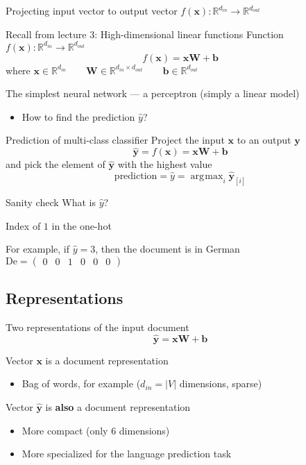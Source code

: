\documentclass[12pt,aspectratio=169,handout]{beamer}
\DeclareMathOperator*{\argmax}{arg\!\max}
\begin{document}
\begin{frame}{Projecting input vector to output vector $f(\bm{x}) : \mathbb{R}^{d_{in}} \to \mathbb{R}^{d_{out}}$}
	
\pause
\begin{block}{Recall from lecture 3: High-dimensional linear functions}
Function $f(\bm{x}) : \mathbb{R}^{d_{in}} \to \mathbb{R}^{d_{out}}$
$$f(\bm{x}) = \bm{x} \bm{W} + \bm{b}$$
where
$\bm{x} \in \mathbb{R}^{d_{in}} \qquad
\bm{W} \in \mathbb{R}^{d_{in} \times d_{out}} \qquad
\bm{b} \in \mathbb{R}^{d_{out}}$
\end{block}	
	
The simplest neural network --- a perceptron (simply a linear model)

\begin{itemize}
	\item How to find the prediction $\hat{y}$?
\end{itemize}

\end{frame}

\begin{frame}{Prediction of multi-class classifier}
Project the input $\bm{x}$ to an output $\bm{y}$
$$\bm{\hat{y}} = f(\bm{x}) = \bm{x} \bm{W} + \bm{b}$$
and pick the element of $\bm{\hat{y}}$ with the highest value
$$
\text{prediction} = \hat{y} = \argmax_{i} \bm{\hat{y}}_{[i]}
$$

\begin{block}{Sanity check}
What is $\hat{y}$?

\pause
Index of $1$ in the one-hot

For example, if $\hat{y} = 3$, then the document is in German
$\text{De} = \begin{pmatrix}0 & 0 & 1 & 0 & 0 & 0\end{pmatrix}$
\end{block}
	
\end{frame}

\subsection{Representations}


\begin{frame}{Two representations of the input document}
$$\bm{\hat{y}} = \bm{x} \bm{W} + \bm{b}$$

Vector $\bm{x}$ is a document representation
\begin{itemize}
	\item Bag of words, for example ($d_{in} = |V|$ dimensions, sparse)
\end{itemize}

Vector $\bm{\hat{y}}$ is \textbf{also} a document representation
\begin{itemize}
	\item More compact (only 6 dimensions)
	\item More specialized for the language prediction task
\end{itemize}

\end{frame}
\end{document}
